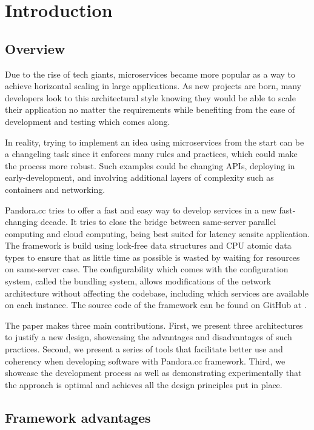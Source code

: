 \chapter {Introduction}
\section{Overview}
Due to the rise of tech giants, microservices became more popular as a way to achieve horizontal scaling in large applications. As new projects are born, many developers look to this architectural style knowing they would be able to scale their application no matter the requirements while benefiting from the ease of development and testing which comes along.

In reality, trying to implement an idea using microservices from the start can be a changeling task since it enforces many rules and practices, which could make the process more robust. Such examples could be changing APIs, deploying in early-development, and involving additional layers of complexity such as containers and networking.

Pandora.cc tries to offer a fast and easy way to develop services in a new fast-changing decade. It tries to close the bridge between same-server parallel computing and cloud computing, being best suited for latency sensite application. The framework is build using lock-free data structures and CPU atomic data types to ensure that as little time as possible is wasted by waiting for resources on same-server case. The configurability which comes with the configuration system, called the bundling system, allows modifications of the network architecture without affecting the codebase, including which services are available on each instance. The source code of the framework can be found on GitHub at .

The paper makes three main contributions. First, we present three architectures to justify a new design, showcasing the advantages and disadvantages of such practices. Second, we present a series of tools that facilitate better use and coherency when developing software with Pandora.cc framework. Third, we showcase the development process as well as demonstrating experimentally that the approach is optimal and achieves all the design principles put in place.

\clearpage

\section*{Framework advantages}


